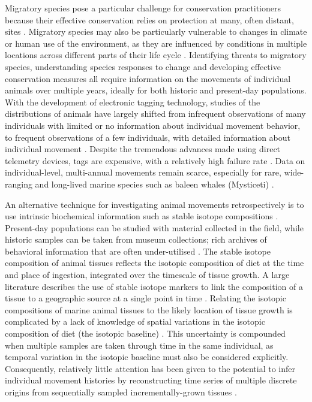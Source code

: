 \documentclass[a4paper,12pt]{article}
\begin{document}
Migratory species pose a particular challenge for conservation practitioners because their effective conservation relies on protection at many, often distant, sites \citep{runge2014conserving}. 
Migratory species may also be particularly vulnerable to changes in climate or human use of the environment, as they are influenced by conditions in multiple locations across different parts of their life cycle \citep{robinson2009travelling}. 
Identifying threats to migratory species, understanding species responses to change and developing effective conservation measures all require information on the movements of individual animals over multiple years, ideally for both historic and present-day populations. 
With the development of electronic tagging technology, studies of the distributions of animals have largely shifted from infrequent observations of many individuals with limited or no information about individual movement behavior, to frequent observations of a few individuals, with detailed information about individual movement \citep{holdo2013inferring}. 
Despite the tremendous advances made using direct telemetry devices, tags are expensive, with a relatively high failure rate \citep{bailey2009behavioural,best2015tag,mate2007evolution}. 
Data on individual-level, multi-annual movements remain scarce, especially for rare, wide-ranging and long-lived marine species such as baleen whales (Mysticeti) \citep{ryan2013stable,hall2005stable,bailey2009behavioural}.

An alternative technique for investigating animal movements retrospectively is to use intrinsic biochemical information such as stable isotope compositions \citep{west2006stable,busquets2017estimating,hobson2008tracking}. 
Present-day populations can be studied with material collected in the field, while historic samples can be taken from museum collections; rich archives of behavioral information that are often under-utilised \citep{lister2011natural}. 
The stable isotope composition of animal tissues reflects the isotopic composition of diet at the time and place of ingestion, integrated over the timescale of tissue growth. 
A large literature describes the use of stable isotope markers to link the composition of a tissue to a geographic source at a single point in time \citep{hobson2008tracking}. 
Relating the isotopic compositions of marine animal tissues to the likely location of tissue growth is complicated by a lack of knowledge of spatial variations in the isotopic composition of diet (the isotopic baseline) \citep{west2006stable,mcmahon2015millennial}. 
This uncertainty is compounded when multiple samples are taken through time in the same individual, as temporal variation in the isotopic baseline must also be considered explicitly. 
Consequently, relatively little attention has been given to the potential to infer individual movement histories by reconstructing time series of multiple discrete origins from sequentially sampled incrementally-grown tissues \citep{trueman2019, sakomoto2018, darnoude2014}.
\end{document}

